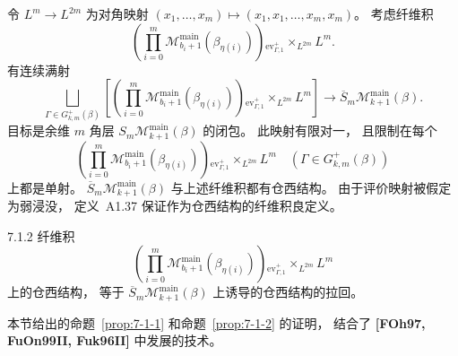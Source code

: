 令 $L^m\to L^{2m}$ 为对角映射
$(x_1,\ldots,x_m)
\mapsto(x_1,x_1,\ldots,x_m,x_m)$。
考虑纤维积
\[
\left(\prod_{i=0}^{m}
\mathcal M^{\mathrm{main}}_{b_i+1}
(\beta_{\eta(i)})\right)
{}_{\operatorname{ev}^+_{\Gamma,1}}
\!\times_{L^{2m}}L^m.
\]
有连续满射
\[
\bigsqcup_{\Gamma\in G^+_{k,m}(\beta)}
\left[
\left(\prod_{i=0}^{m}
\mathcal M^{\mathrm{main}}_{b_i+1}
(\beta_{\eta(i)})\right)
{}_{\operatorname{ev}^+_{\Gamma,1}}
\!\times_{L^{2m}}L^m
\right]
\longrightarrow
\overline{S}_m
\mathcal M^{\mathrm{main}}_{k+1}(\beta).
\]
目标是余维 $m$ 角层
$S_m\mathcal M^{\mathrm{main}}_{k+1}(\beta)$
的闭包。
此映射有限对一，
且限制在每个
\[
\left(\prod_{i=0}^{m}
\mathcal M^{\mathrm{main}}_{b_i+1}
(\beta_{\eta(i)})\right)
{}_{\operatorname{ev}^+_{\Gamma,1}}
\!\times_{L^{2m}}L^m
\quad(\Gamma\in G^+_{k,m}(\beta))
\]
上都是单射。
$\overline{S}_m\mathcal M^{\mathrm{main}}_{k+1}(\beta)$
与上述纤维积都有仓西结构。
由于评价映射被假定为弱浸没，
定义~A1.37 保证作为仓西结构的纤维积良定义。

\begin{proposition}{7.1.2}\label{prop:7-1-2}
纤维积
\[
\left(\prod_{i=0}^{m}
\mathcal M^{\mathrm{main}}_{b_i+1}
(\beta_{\eta(i)})\right)
{}_{\operatorname{ev}^+_{\Gamma,1}}
\!\times_{L^{2m}}L^m
\]
上的仓西结构，
等于
$\overline{S}_m\mathcal M^{\mathrm{main}}_{k+1}(\beta)$
上诱导的仓西结构的拉回。
\end{proposition}

本节给出的命题~\ref{prop:7-1-1}
和命题~\ref{prop:7-1-2} 的证明，
结合了 \textbf{[FOh97, FuOn99II, Fuk96II]}
中发展的技术。

